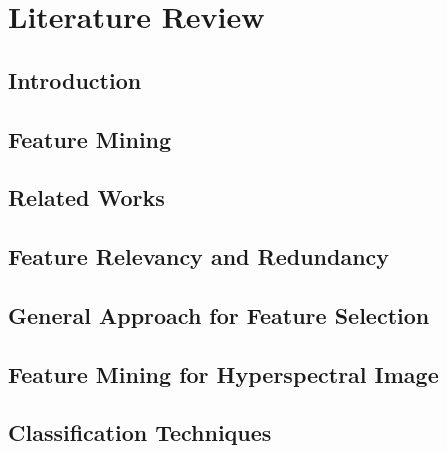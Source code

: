 \documentclass[document.tex]{subfiles}
\begin{document}
\chapter{Literature Review}

\section{Introduction}

\section{Feature Mining}

\section{Related Works}

\section{Feature Relevancy and Redundancy}

\section{General Approach for Feature Selection}

\section{Feature Mining for Hyperspectral Image}

\section{Classification Techniques}
\end{document}
